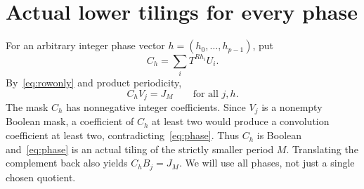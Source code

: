 \documentclass[11pt]{article}
\begin{document}
\section{Actual lower tilings for every phase}\label{sec:phases}
For an arbitrary integer phase vector $h=(h_0,\ldots,h_{p-1})$, put
\[
 C_h=\sum_i T^{Rh_i}U_i.
\]
By~\eqref{eq:rowonly} and product periodicity,
\begin{equation}\label{eq:phase}
 C_hV_j=J_M\qquad\text{for all }j,h.
\end{equation}
The mask $C_h$ has nonnegative integer coefficients. Since $V_j$ is a nonempty Boolean mask, a coefficient of $C_h$ at least two would produce a convolution coefficient at least two, contradicting~\eqref{eq:phase}. Thus $C_h$ is Boolean and~\eqref{eq:phase} is an actual tiling of the strictly smaller period $M$. Translating the complement back also yields $C_hB_j=J_M$. We will use all phases, not just a single chosen quotient.
\end{document}
